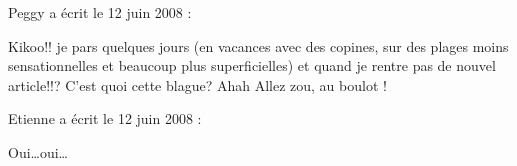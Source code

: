 \medskip
Peggy a écrit le 12 juin 2008 :
\begin{displayquote}
Kikoo!! je pars quelques jours (en vacances avec des copines, sur des plages moins sensationnelles et beaucoup plus superficielles) et quand je rentre pas de nouvel article!!?
C'est quoi cette blague? Ahah
Allez zou, au boulot !
\end{displayquote}

\medskip
Etienne a écrit le 12 juin 2008 :
\begin{displayquote}
Oui\dots oui\dots
\end{displayquote}

\vfill
